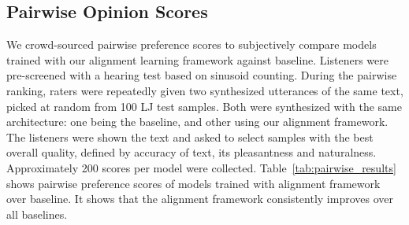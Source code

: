 

\subsection{Pairwise Opinion Scores}
We crowd-sourced pairwise preference scores to subjectively compare models trained with our alignment learning framework against baseline. Listeners were pre-screened with a hearing test based on sinusoid counting. During the pairwise ranking, raters were repeatedly given two synthesized utterances of the same text, picked at random from 100 LJ test samples. Both were synthesized with the same architecture: one being the baseline, and other using our alignment framework. The listeners were shown the text and asked to select samples with the best overall quality, defined by accuracy of text, its pleasantness and naturalness. Approximately 200 scores per model were collected. Table~\ref{tab:pairwise_results} shows pairwise preference scores of models trained with alignment framework over baseline. It shows that the alignment framework consistently improves over all baselines.

